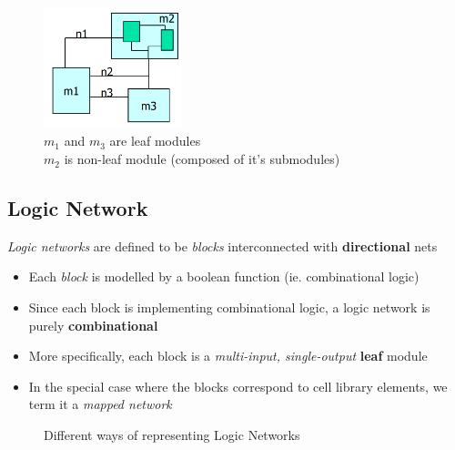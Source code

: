 \documentclass{article}
\begin{document}
\begin{figure}[htp]
    \centering
    \includegraphics[width=4cm, scale=1]{S1/hierarchy.PNG}
    \caption{$m_{1}$ and $m_{3}$ are leaf modules\\
             $m_{2}$ is non-leaf module (composed of it's submodules)}
\end{figure}

\subsection{Logic Network}
\textit{Logic networks} are defined to be \textit{blocks} interconnected with \textbf{directional} nets
\begin{itemize}
    \item Each \textit{block} is modelled by a boolean function (ie. combinational logic)
    \item Since each block is implementing combinational logic, a logic network is purely \textbf{combinational}
    \item More specifically, each block is a \textit{multi-input, single-output} \textbf{leaf} module
    \item In the special case where the blocks correspond to cell library elements, we term it a \textit{mapped network}
\end{itemize}

\begin{figure}[htp]%
    \centering
    \qquad
    \caption{Different ways of representing Logic Networks}%
\end{figure}
\end{document}
